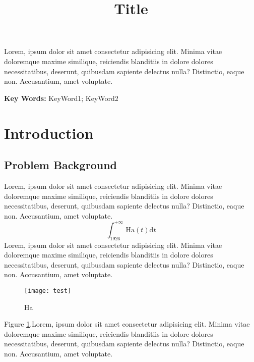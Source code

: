 \documentclass[UTF8]{mcmthesis}
\title{\bfseries Title}  %
\begin{document}
    \begin{summary}
        Lorem, ipsum dolor sit amet consectetur adipisicing elit. Minima vitae doloremque maxime similique, reiciendis blanditiis in dolore dolores necessitatibus, deserunt, quibusdam sapiente delectus nulla? Distinctio, eaque non. Accusantium, amet voluptate.

        \vspace{2em}
        \noindent\textbf{Key Words: } KeyWord1; KeyWord2
    \end{summary}

    \maketitle
    \newpage
    \tableofcontents

    \newpage
    \setcounter{page}{1}
    \section{Introduction}
        \subsection{Problem Background}
            \hspace*{2em}Lorem, ipsum dolor sit amet consectetur adipisicing elit. Minima vitae doloremque maxime similique, reiciendis blanditiis in dolore dolores necessitatibus, deserunt, quibusdam sapiente delectus nulla? Distinctio, eaque non. Accusantium, amet voluptate. \cite{link}
            \[
                \int_{1926}^{+\infty} \text{Ha}(t)\mathrm{d}t
            \]
            Lorem, ipsum dolor sit amet consectetur adipisicing elit. Minima vitae doloremque maxime similique, reiciendis blanditiis in dolore dolores necessitatibus, deserunt, quibusdam sapiente delectus nulla? Distinctio, eaque non. Accusantium, amet voluptate. 
            \begin{figure}[htpb]
                \centering
                \texttt{[image: test]}
                \vspace{-1em}
                \caption{Ha}
                \label{fig:1}
            \end{figure}
            
            Figure \ref{fig:1}.Lorem, ipsum dolor sit amet consectetur adipisicing elit. Minima vitae doloremque maxime similique, reiciendis blanditiis in dolore dolores necessitatibus, deserunt, quibusdam sapiente delectus nulla? Distinctio, eaque non. Accusantium, amet voluptate. 
\end{document}
